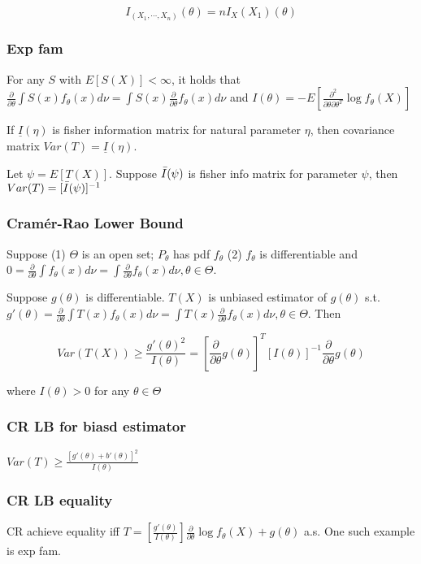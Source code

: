 $$
I_{(X_1, \cdots, X_n)}(\theta) = nI_X{(X_1)}(\theta)
$$

\subsubsection{Exp fam}

For any $S$ with $E[S(X)]<\infty$, it holds that $\frac{\partial}{\partial\theta}\int S(x) f_\theta(x) d\nu = \int S(x)\frac{\partial}{\partial\theta}f_\theta(x) d\nu$ and $I(\theta)=-E\left[\frac{\partial^2}{\partial\theta\partial\theta^T}\log f_\theta (X)\right]$

If $\underline{I}(\eta)$ is fisher information matrix for natural parameter $\eta$, then covariance matrix $Var(T)=\underline{I}(\eta)$.

Let $\psi=E[T(X)]$. Suppose $\Bar{I}(\psi)$ is fisher info matrix for parameter $\psi$, then $Var(T)=[\Bar{I}(\psi)]^{-1}$

\subsubsection{Cramér-Rao Lower Bound}

Suppose (1) $\Theta$ is an open set; $P_\theta$ has pdf $f_\theta$ (2) $f_\theta$ is differentiable and $0=\frac{\partial}{\partial\theta}\int f_\theta(x) d\nu = \int \frac{\partial}{\partial\theta}f_\theta(x)d\nu, \theta\in\Theta$.

Suppose $g(\theta)$ is differentiable. $T(X)$ is unbiased estimator of $g(\theta)$ s.t. $g'(\theta)=\frac{\partial}{\partial\theta}\int T(x) f_\theta(x)d\nu=\int T(x)\frac{\partial}{\partial\theta}f_\theta(x)d\nu, \theta\in\Theta$. Then


$$
Var(T(X))\geq \frac{g'(\theta)^2}{I(\theta)} = \left[
        \frac{\partial}{\partial\theta}g(\theta)
    \right]^T [I(\theta)]^{-1} \frac{\partial}{\partial\theta} g(\theta)
$$

where $I(\theta)>0$ for any $\theta\in\Theta$

\subsubsection{CR LB for biasd estimator}

$Var(T) \geq \frac{[g'(\theta) + b'(\theta)]^2}{I(\theta)}$

\subsubsection{CR LB equality}

CR achieve equality iff $T = \left[\frac{g'(\theta)}{I(\theta)}\right]\frac{\partial}{\partial\theta}\log f_\theta(X) + g(\theta)$ a.s. One such example is exp fam.